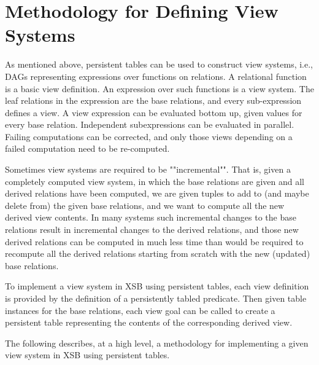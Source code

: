 \section{Methodology for Defining View Systems}

As mentioned above, persistent tables can be used to construct view
systems, i.e., DAGs representing expressions over functions on
relations.  A relational function is a basic view definition.  An
expression over such functions is a view system.  The leaf relations
in the expression are the base relations, and every sub-expression
defines a view.  A view expression can be evaluated bottom up, given
values for every base relation.  Independent subexpressions can be
evaluated in parallel.  Failing computations can be corrected, and
only those views depending on a failed computation need to be
re-computed.

Sometimes view systems are required to be ""incremental"".  That is,
given a completely computed view system, in which the base relations
are given and all derived relations have been computed, we are given
tuples to add to (and maybe delete from) the given base relations, and
we want to compute all the new derived view contents.  In many systems
such incremental changes to the base relations result in incremental
changes to the derived relations, and those new derived relations can
be computed in much less time than would be required to recompute all
the derived relations starting from scratch with the new (updated)
base relations.

To implement a view system in XSB using persistent tables, each view
definition is provided by the definition of a persistently tabled
predicate.  Then given table instances for the base relations, each
view goal can be called to create a persistent table representing the
contents of the corresponding derived view.

The following describes, at a high level, a methodology for
implementing a given view system in XSB using persistent tables.

